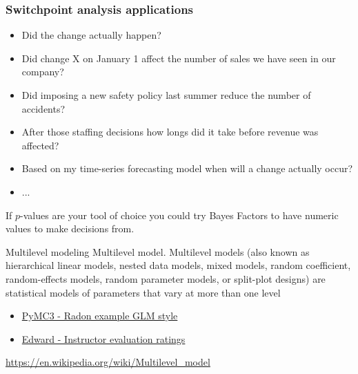 \documentclass[table,dvipsnames]{beamer}
\begin{document}
\begin{frame}[fragile]
\frametitle{Switchpoint analysis applications}
\begin{block}{}
\begin{itemize}
 \item Did the change actually happen?
 \item Did change X on January 1 affect the number of sales we have seen in our company?
 \item Did imposing a new safety policy last summer reduce the number of accidents?
 \item After those staffing decisions how longs did it take before revenue was affected?
 \item Based on my time-series forecasting model when will a change actually occur?
 \item ...
\end{itemize}
\end{block}
\begin{block}{}
If $p$-values are your tool of choice you could try Bayes Factors to have numeric values to make decisions from.
\end{block}
\end{frame}

\begin{frame}[fragile]
\begin{block}{Multilevel modeling}
Multilevel model. Multilevel models (also known as hierarchical linear models, nested data models, mixed models, random coefficient, random-effects models, random parameter models, or split-plot designs) are statistical models of parameters that vary at more than one level
\end{block}
\vspace{1cm}
\begin{itemize}
 \item \href{http://twiecki.github.io/blog/2014/03/17/bayesian-glms-3/}{PyMC3 - Radon example GLM style}
 \item \href{http://edwardlib.org/tutorials/linear-mixed-effects-models}{Edward - Instructor evaluation ratings}
\end{itemize}
\vspace{1cm}
\href{https://en.wikipedia.org/wiki/Multilevel\_model}{https://en.wikipedia.org/wiki/Multilevel\_model}
\end{frame}
\end{document}
